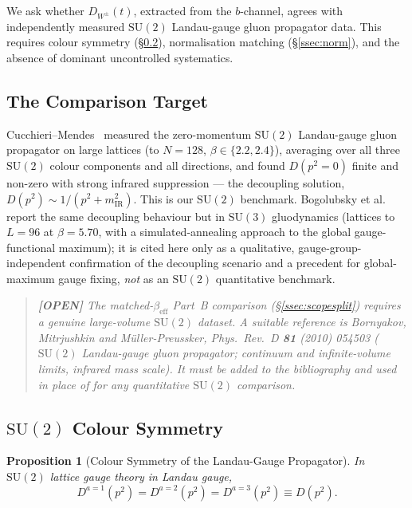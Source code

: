 \documentclass[11pt,a4paper]{article}
\theoremstyle{plain}
\newtheorem{proposition}{Proposition}
\theoremstyle{definition}
\theoremstyle{remark}
\newcommand{\SU}{\mathrm{SU}}
\newcommand{\DW}{D_{W^{\pm}}}
\newcommand{\be}{\beta_{\mathrm{eff}}}
\begin{document}
We ask whether $\DW(t)$, extracted from the $b$-channel, agrees with
independently measured $\SU(2)$ Landau-gauge gluon propagator data. This
requires colour symmetry (\S\ref{ssec:colour}), normalisation matching
(\S\ref{ssec:norm}), and the absence of dominant uncontrolled systematics.

\subsection{The Comparison Target}
\label{ssec:target}

Cucchieri--Mendes~\cite{CM} measured the zero-momentum $\SU(2)$
Landau-gauge gluon propagator on large lattices (to $N=128$,
$\beta\in\{2.2,2.4\}$), averaging over all three $\SU(2)$ colour components
and all directions, and found $D(p^2{=}0)$ finite and non-zero with strong
infrared suppression --- the decoupling solution,
$D(p^2)\sim 1/(p^2+m_{\mathrm{IR}}^2)$. This is our $\SU(2)$ benchmark.
Bogolubsky et al.~\cite{Bo} report the same decoupling behaviour but in
$\SU(3)$ gluodynamics (lattices to $L=96$ at $\beta=5.70$, with a
simulated-annealing approach to the global gauge-functional maximum); it is
cited here only as a qualitative, gauge-group-independent confirmation of
the decoupling scenario and a precedent for global-maximum gauge fixing,
\emph{not} as an $\SU(2)$ quantitative benchmark.
\begin{quote}\itshape\textbf{[OPEN]} The matched-$\be$ Part~B comparison
(\S\ref{ssec:scopesplit}) requires a genuine large-volume $\SU(2)$ dataset.
A suitable reference is Bornyakov, Mitrjushkin and M\"uller-Preussker,
\emph{Phys.\ Rev.\ D} \textbf{81} (2010) 054503 ($\SU(2)$ Landau-gauge
gluon propagator; continuum and infinite-volume limits, infrared mass
scale). It must be added to the bibliography and used in place of \cite{Bo}
for any quantitative $\SU(2)$ comparison.\end{quote}

\subsection{$\SU(2)$ Colour Symmetry}
\label{ssec:colour}

\begin{proposition}[Colour Symmetry of the Landau-Gauge Propagator]
In $\SU(2)$ lattice gauge theory in Landau gauge,
\begin{equation}
  D^{a=1}(p^2)=D^{a=2}(p^2)=D^{a=3}(p^2)\equiv D(p^2).
  \label{eq:colour}
\end{equation}
\end{proposition}
\end{document}
